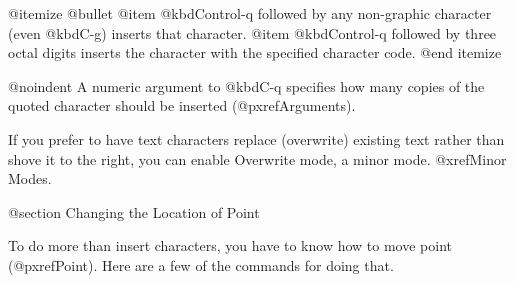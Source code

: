 {{{@itemize @bullet
@item
@kbd{Control-q} followed by any non-graphic character (even @kbd{C-g})
inserts that character.
@item
@kbd{Control-q} followed by three octal digits inserts the character
with the specified character code.
@end itemize

@noindent
A numeric argument to @kbd{C-q} specifies how many copies of the
quoted character should be inserted (@pxref{Arguments}).

  If you prefer to have text characters replace (overwrite) existing
text rather than shove it to the right, you can enable Overwrite mode,
a minor mode.  @xref{Minor Modes}.

@section Changing the Location of Point

  To do more than insert characters, you have to know how to move
point (@pxref{Point}).  Here are a few of the commands for doing that.

}}}
